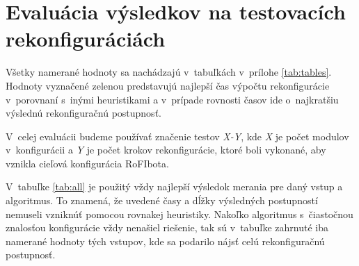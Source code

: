 \documentclass[
  printed, %
  oneside, %
  notable,   %
  nolof,     %
  nolot,     %
]{fithesis3}
\begin{document}
\section{Evaluácia výsledkov na testovacích rekonfiguráciách}
Všetky namerané hodnoty sa nachádzajú v~tabuľkách v~prílohe \ref{tab:tables}. Hodnoty vyznačené \colorbox{table-green}{zelenou} predstavujú najlepší čas výpočtu rekonfigurácie v~porovnaní s~inými heuristikami a v~prípade rovnosti časov ide o~najkratšiu výslednú rekonfiguračnú postupnosť. 

V~celej evaluácii budeme používať značenie testov \textit{X-Y}, kde \textit{X} je počet modulov v~konfigurácii a \textit{Y} je počet krokov rekonfigurácie, ktoré boli vykonané, aby vznikla cieľová konfigurácia RoFIbota. 

V~tabuľke \ref{tab:all} je použitý vždy najlepší výsledok merania pre daný vstup a algoritmus. To znamená, že uvedené časy a dĺžky výsledných postupností nemuseli vzniknúť pomocou rovnakej heuristiky. Nakoľko algoritmus s~čiastočnou znalosťou konfigurácie vždy nenašiel riešenie, tak sú v~tabuľke zahrnuté iba namerané hodnoty tých vstupov, kde sa podarilo nájsť celú rekonfiguračnú postupnosť. 
\end{document}
